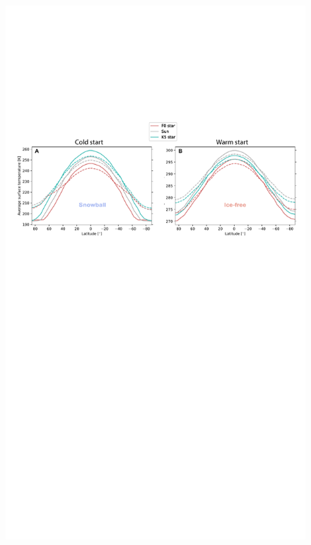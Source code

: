 \documentclass[fleqn,usenatbib]{mnras}
\begin{document}
\begin{figure}
	\includegraphics[width=\textwidth]{Figures/Comparison_a0_rev.pdf}

\end{figure}
\end{document}
